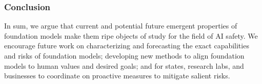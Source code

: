 \subsubsection{Conclusion}
In sum, we argue that current and potential future emergent properties of foundation models make them ripe objects of study for the field of AI safety. We encourage future work on characterizing and forecasting the exact capabilities and risks of foundation models; developing new methods to align foundation models to human values and desired goals; and for states, research labs, and businesses to coordinate on proactive measures to mitigate salient risks.
